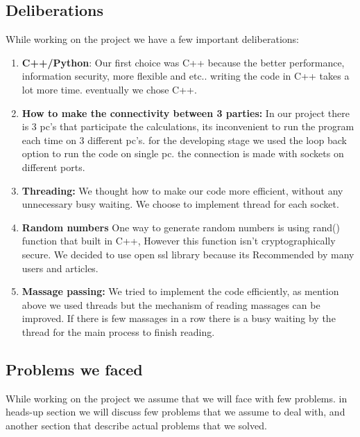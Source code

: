 \documentclass[12pt]{article}
\begin{document}
\subsection{Deliberations}
While working on the project we have a few important deliberations:\hfill\break
\begin{enumerate}
	\item \textbf{C++/Python}: Our first choice was C++ because the better performance, information security, more flexible and etc.. writing the code in C++ takes a lot more time. eventually we chose C++.
	\item \textbf{How to make the connectivity between 3 parties:}\hfill\break
	In our project there is 3 pc's that participate the calculations, its inconvenient to run the program each time on 3 different pc's. for the developing stage we used the loop back option to run the code on single pc. the connection is made with sockets on different ports.
	
	\item \textbf{Threading:} We thought how to make our code more efficient, without any unnecessary busy waiting. We choose to implement thread for each socket.
	\item \textbf{Random numbers} One way to generate random numbers is using rand() function that built in C++, However this function isn't cryptographically secure. We decided to use open ssl library because its Recommended by many users and articles.
	\item\textbf{Massage passing:} We tried to implement the code efficiently, as mention above we used threads but the mechanism of reading massages can be improved. If there is few massages in a row there is a busy waiting by the thread for the main process to finish reading. 
\end{enumerate}


\subsection{Problems we faced}
While working on the project we assume that we will face with few problems. in heads-up section we will discuss few problems that we assume to deal with, and another section that describe actual problems that we solved.
\end{document}
